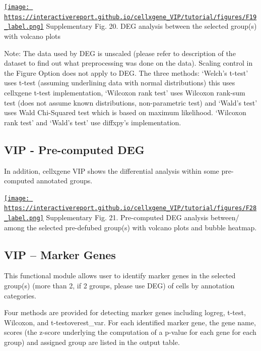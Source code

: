 \documentclass[
]{article}
\begin{document}
\href{https://interactivereport.github.io/cellxgene_VIP/tutorial/figures/F19_label.png}{\texttt{[image: https://interactivereport.github.io/cellxgene\_VIP/tutorial/figures/F19\_label.png]}}
Supplementary Fig. 20. DEG analysis between the selected group(s) with volcano plots

Note: The data used by DEG is unscaled (please refer to description of the dataset to find out what preprocessing was done on the data). Scaling control in the Figure Option does not apply to DEG. The three methods: `Welch's t-test' uses t-test (assuming underlining data with normal distributions) this uses cellxgene t-test implementation, `Wilcoxon rank test' uses Wilcoxon rank-sum test (does not assume known distributions, non-parametric test) and `Wald's test' uses Wald Chi-Squared test which is based on maximum likelihood. `Wilcoxon rank test' and `Wald's test' use diffxpy's implementation.

\hypertarget{vip---pre-computed-deg}{%
\subsection{VIP - Pre-computed DEG}\label{vip---pre-computed-deg}}

In addition, cellxgene VIP shows the differential analysis within some pre-computed annotated groups.

\href{https://interactivereport.github.io/cellxgene_VIP/tutorial/figures/F28_label.png}{\texttt{[image: https://interactivereport.github.io/cellxgene\_VIP/tutorial/figures/F28\_label.png]}}
Supplementary Fig. 21. Pre-computed DEG analysis between/ among the selected pre-defubed group(s) with volcano plots and bubble heatmap.

\hypertarget{vip-marker-genes}{%
\subsection{VIP -- Marker Genes}\label{vip-marker-genes}}

This functional module allows user to identify marker genes in the selected group(s) (more than 2, if 2 groups, please use DEG) of cells by annotation categories.

Four methods are provided for detecting marker genes including logreg, t-test, Wilcoxon, and t-testoverest\_var. For each identified marker gene, the gene name, scores (the z-score underlying the computation of a p-value for each gene for each group) and assigned group are listed in the output table.
\end{document}
